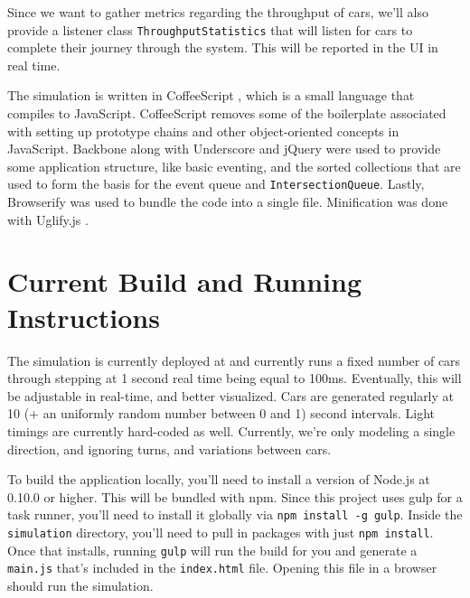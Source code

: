 \documentclass[a4paper,12pt]{article}
\begin{document}
Since we want to gather metrics regarding the throughput of cars, we'll also provide a listener class
\texttt{ThroughputStatistics} that will listen for cars to complete their journey through the system. This will
be reported in the UI in real time.

The simulation is written in CoffeeScript \cite{coffeescript}, which is a small language that compiles to JavaScript.
CoffeeScript removes some of the boilerplate associated with setting up prototype chains and other object-oriented
concepts in JavaScript.
Backbone \cite{backbone} along with Underscore \cite{underscore} and jQuery \cite{jquery} were used to provide some
application structure, like basic eventing, and the sorted
collections that are used to form the basis for the event queue and \texttt{IntersectionQueue}. Lastly, Browserify
\cite{browserify} was used to bundle the code into a single file. Minification was done with Uglify.js \cite{uglify}.

\section{Current Build and Running Instructions}
The simulation is currently deployed at \cite{aprilandchip} and currently runs a fixed number of cars through stepping
at 1 second real time being equal to 100ms. Eventually, this will be adjustable in real-time, and better visualized.
Cars are generated regularly at 10 (+ an uniformly random number between 0 and 1) second intervals. Light timings are
currently hard-coded as well. Currently, we're only modeling a single direction, and ignoring turns, and variations
between cars.

To build the application locally, you'll need to install a version of Node.js \cite{nodejs} at 0.10.0 or higher. This will be bundled
with npm. Since this project uses gulp for a task runner, you'll need to install it globally via
\texttt{npm install -g gulp}. Inside the \texttt{simulation} directory, you'll need to pull in packages with just
\texttt{npm install}. Once that installs, running \texttt{gulp} will run the build for you and generate a
\texttt{main.js} that's included in the \texttt{index.html} file. Opening this file in a browser should run the
simulation.



\end{document}
